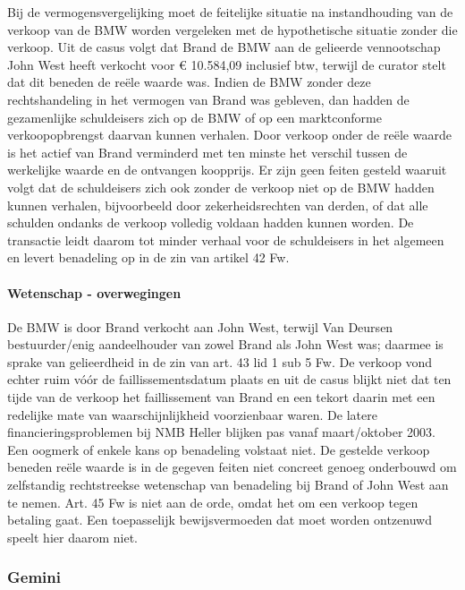 \documentclass[
  dutch,
  a4paper,
]{article}
\begin{document}
Bij de vermogensvergelijking moet de feitelijke situatie na instandhouding van de verkoop van de BMW worden vergeleken met de hypothetische situatie zonder die verkoop. Uit de casus volgt dat Brand de BMW aan de gelieerde vennootschap John West heeft verkocht voor € 10.584,09 inclusief btw, terwijl de curator stelt dat dit beneden de reële waarde was. Indien de BMW zonder deze rechtshandeling in het vermogen van Brand was gebleven, dan hadden de gezamenlijke schuldeisers zich op de BMW of op een marktconforme verkoopopbrengst daarvan kunnen verhalen. Door verkoop onder de reële waarde is het actief van Brand verminderd met ten minste het verschil tussen de werkelijke waarde en de ontvangen koopprijs. Er zijn geen feiten gesteld waaruit volgt dat de schuldeisers zich ook zonder de verkoop niet op de BMW hadden kunnen verhalen, bijvoorbeeld door zekerheidsrechten van derden, of dat alle schulden ondanks de verkoop volledig voldaan hadden kunnen worden. De transactie leidt daarom tot minder verhaal voor de schuldeisers in het algemeen en levert benadeling op in de zin van artikel 42 Fw.

\paragraph{Wetenschap - overwegingen}\label{wetenschap---overwegingen-55}

De BMW is door Brand verkocht aan John West, terwijl Van Deursen bestuurder/enig aandeelhouder van zowel Brand als John West was; daarmee is sprake van gelieerdheid in de zin van art. 43 lid 1 sub 5 Fw. De verkoop vond echter ruim vóór de faillissementsdatum plaats en uit de casus blijkt niet dat ten tijde van de verkoop het faillissement van Brand en een tekort daarin met een redelijke mate van waarschijnlijkheid voorzienbaar waren. De latere financieringsproblemen bij NMB Heller blijken pas vanaf maart/oktober 2003. Een oogmerk of enkele kans op benadeling volstaat niet. De gestelde verkoop beneden reële waarde is in de gegeven feiten niet concreet genoeg onderbouwd om zelfstandig rechtstreekse wetenschap van benadeling bij Brand of John West aan te nemen. Art. 45 Fw is niet aan de orde, omdat het om een verkoop tegen betaling gaat. Een toepasselijk bewijsvermoeden dat moet worden ontzenuwd speelt hier daarom niet.

\newpage


\subsubsection{Gemini}\label{gemini-18}
\end{document}
